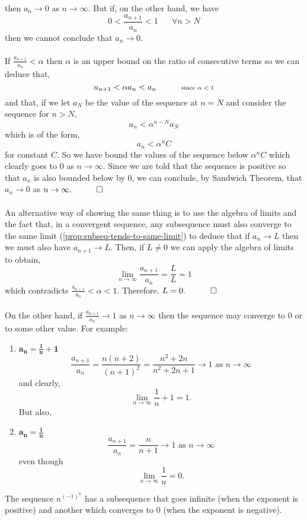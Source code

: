 \documentclass[../MathsNotesBase.tex]{subfiles}
\begin{document}
\begin{exe}
{{{						then ${ a_n \to 0 }$ as ${ n \to \infty }$. But if, on the other hand, we have
						\[ 0 < \frac{a_{n+1}}{a_n} < 1 \hspace{20pt} \forall n > N \]
						then we cannot conclude that ${ a_n \to 0 }$.
				 }}\\\\
				If ${ \frac{a_{n+1}}{a_n} < \alpha }$ then $\alpha$ is an upper bound on the ratio of consecutive terms so we can deduce that,
				\[ a_{n+1} < \alpha a_n < a_n \hspace{30pt} \text{\scriptsize{since ${ \alpha < 1 }$}} \]
				and that, if we let ${ a_N }$ be the value of the sequence at ${ n = N }$ and consider the sequence for ${ n > N }$,
				\[ a_n < \alpha^{n - N}a_N \]
				which is of the form,
				\[ a_n < \alpha^n C \]
				for constant $C$. So we have bound the values of the sequence below ${ \alpha^n C }$ which clearly goes to 0 as ${ n \to \infty }$. Since we are told that the sequence is positive so that $a_n$ is also bounded below by 0, we can conclude, by Sandwich Theorem, that ${ a_n \to 0 }$ as ${ n \to \infty. \hspace{10pt}\qed}$\\\\
				An alternative way of showing the same thing is to use the algebra of limits and the fact that, in a convergent sequence, any subsequence must also converge to the same limit (\autoref{prop:subseq-tends-to-same-limit}) to deduce that if ${ a_n \to L }$ then we must also have ${ a_{n+1} \to L }$. Then, if ${ L \neq 0 }$ we can apply the algebra of limits to obtain,
				\[ \lim_{n \to \infty} \frac{a_{n+1}}{a_n} = \frac{L}{L} = 1 \]
				which contradicts ${ \frac{a_{n+1}}{a_n} < \alpha < 1 }$. Therefore, ${ L = 0.  \hspace{10pt}\qed}$\\\\
				On the other hand, if ${ \frac{a_{n+1}}{a_n} \to 1 }$ as ${ n \to \infty }$ then the sequence may converge to 0 or to some other value. For example:
				\begin{enumerate}[label=(\roman*)]
					\item{${\bm{ a_n = \frac{1}{n} + 1 }}$}
					\[ \frac{a_{n+1}}{a_n} = \frac{n(n+2)}{(n+1)^2} =\frac{n^2 + 2n}{n^2 + 2n + 1} \to 1 \text{ as } n \to \infty \]
					and clearly,
					\[ \lim_{n \to \infty} \frac{1}{n} + 1 = 1. \]
					But also,
					\item{${\bm{ a_n = \frac{1}{n} }}$}
					\[  \frac{a_{n+1}}{a_n} = \frac{n}{n+1} \to 1 \text{ as } n \to \infty \]
					even though
					\[ \lim_{n \to \infty} \frac{1}{n} = 0. \]
				\end{enumerate}
			}
						
			\ex The sequence $n^{(-1)^n}$ has a subsequence that goes infinite (when the exponent is positive) and another which converges to 0 (when the exponent is negative).
			\label{convergent-subsequence-of-a_n-does-not-prove-that-a_n-converges}
		\end{exe}
\end{document}
